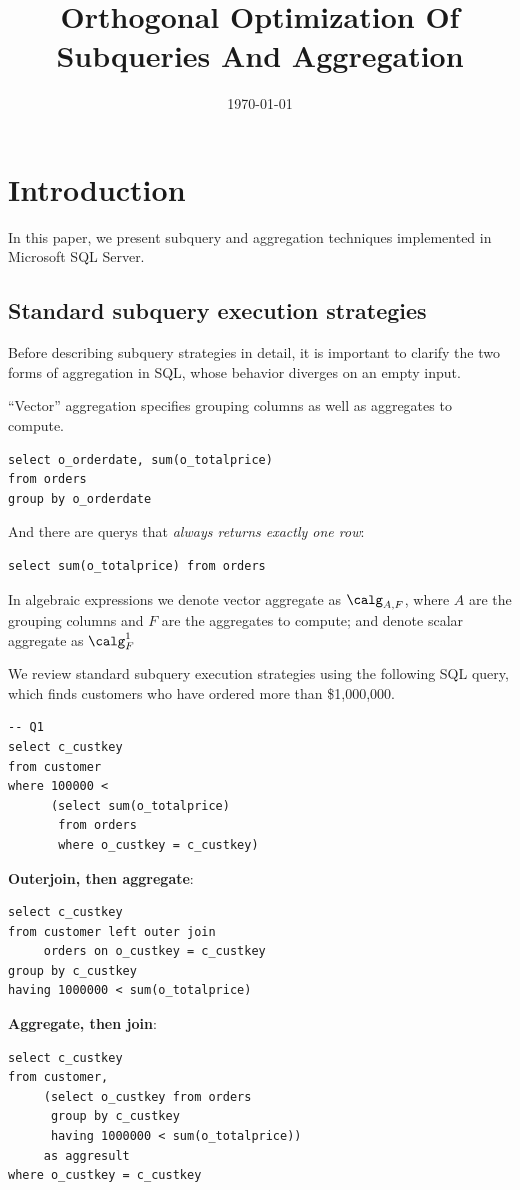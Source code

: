 \documentclass[11pt]{article}
\date{\today}
\title{Orthogonal Optimization Of Subqueries And Aggregation}
\begin{document}
\maketitle
\section{Introduction}
\label{sec:org599abbf}
In this paper, we present subquery and aggregation techniques implemented in Microsoft SQL Server.
\subsection{Standard subquery execution strategies}
\label{sec:org36c090c}
Before describing subquery strategies in detail, it is important to clarify the two forms of
aggregation in SQL, whose behavior diverges on an empty input.

“Vector” aggregation specifies grouping columns as well as aggregates to compute.
\begin{verbatim}
select o_orderdate, sum(o_totalprice)
from orders
group by o_orderdate
\end{verbatim}

And there are querys that \emph{always returns exactly one row}:
\begin{verbatim}
select sum(o_totalprice) from orders
\end{verbatim}

In algebraic expressions we denote vector aggregate as \(\calg_{A,F}\), where \(A\) are the grouping
columns and \(F\) are the aggregates to compute; and denote scalar aggregate as \(\calg^1_F\)

We review standard subquery execution strategies using the following SQL query, which finds customers
who have ordered more than \$1,000,000.
\begin{verbatim}
-- Q1
select c_custkey
from customer
where 100000 <
      (select sum(o_totalprice)
       from orders
       where o_custkey = c_custkey)
\end{verbatim}

\textbf{Outerjoin, then aggregate}:
\begin{verbatim}
select c_custkey
from customer left outer join
     orders on o_custkey = c_custkey
group by c_custkey
having 1000000 < sum(o_totalprice)
\end{verbatim}

\textbf{Aggregate, then join}:
\begin{verbatim}
select c_custkey
from customer,
     (select o_custkey from orders
      group by c_custkey
      having 1000000 < sum(o_totalprice))
     as aggresult
where o_custkey = c_custkey
\end{verbatim}
\end{document}
